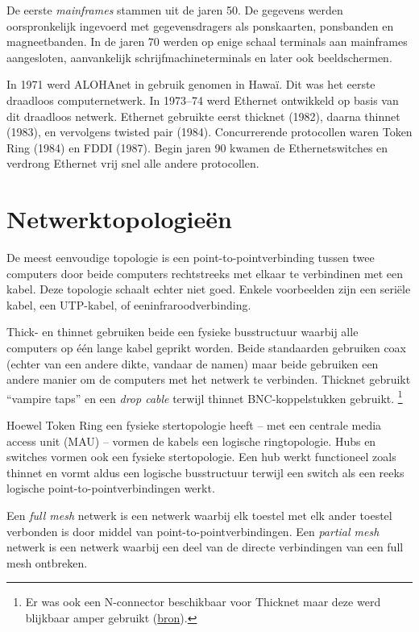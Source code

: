 De eerste \emph{mainframes} stammen uit de jaren 50.
De gegevens werden oorspronkelijk ingevoerd met gegevensdragers als ponskaarten, ponsbanden en magneetbanden.
In de jaren 70 werden op enige schaal terminals aan mainframes aangesloten, aanvankelijk schrijfmachineterminals en later ook beeldschermen.

In 1971 werd ALOHAnet in gebruik genomen in Hawaï.
Dit was het eerste draadloos computernetwerk.
In 1973--74 werd Ethernet ontwikkeld op basis van dit draadloos netwerk.
Ethernet gebruikte eerst thicknet (1982), daarna thinnet (1983), en vervolgens twisted pair (1984).
Concurrerende protocollen waren Token Ring (1984) en FDDI (1987).
Begin jaren 90 kwamen de Ethernetswitches en verdrong Ethernet vrij snel alle andere protocollen.



\section{Netwerktopologieën}

De meest eenvoudige topologie is een point-to-pointverbinding tussen twee computers door beide computers rechtstreeks met elkaar te verbindinen met een kabel.
Deze topologie schaalt echter niet goed.
Enkele voorbeelden zijn een seriële kabel, een UTP-kabel, of eeninfraroodverbinding.

Thick- en thinnet gebruiken beide een fysieke busstructuur waarbij alle computers op één lange kabel geprikt worden.
Beide standaarden gebruiken coax (echter van een andere dikte, vandaar de namen) maar beide gebruiken een andere manier om de computers met het netwerk te verbinden.
Thicknet gebruikt ``vampire taps'' en een \emph{drop cable} terwijl thinnet BNC-koppelstukken gebruikt.%
   \footnote{Er was ook een N-connector beschikbaar voor Thicknet maar deze werd blijkbaar amper gebruikt (\href{http://www.mattmillman.com/projects/10base5/}{bron}).}

Hoewel Token Ring een fysieke stertopologie heeft -- met een centrale media access unit (MAU) -- vormen de kabels een logische ringtopologie.
Hubs en switches vormen ook een fysieke stertopologie.
Een hub werkt functioneel zoals thinnet en vormt aldus een logische busstructuur terwijl een switch als een reeks logische point-to-pointverbindingen werkt.

Een \emph{full mesh} netwerk is een netwerk waarbij elk toestel met elk ander toestel verbonden is door middel van point-to-pointverbindingen.
Een \emph{partial mesh} netwerk is een netwerk waarbij een deel van de directe verbindingen van een full mesh ontbreken.



